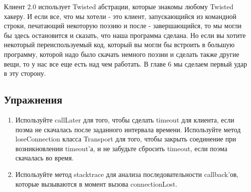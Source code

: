 Клиент 2.0 использует Twisted абстрации, которые 
знакомы любому Twisted хакеру. И если все, что мы хотели - 
это клиент, запускающийся из командной строки, печатающий 
некоторую поэзию и после - завершающийся, то мы могли бы здесь остановится и 
сказать, что наша программа сделана. Но если вы хотите некоторый 
переиспользуемый код, который вы могли 
бы встроить в большую программу, которой надо было 
скачать немного поэзии и сделать также другие вещи, то у нас все 
еще есть над чем работать. В главе 6 мы сделаем первый удар в эту сторону.

\subsection{Упражнения}

\begin{enumerate}
\item Используйте callLater для того, чтобы сделать timeout для клиента, 
если поэма не скачалась после заданного интервала времени. 
Используйте метод loseConnection класса Transport  для того, чтобы закрыть соединение 
при возникновлении timeout'а, и не забудьте сбросить timeout, если 
поэма скачалась во время. 
\item Используйте метод stacktrace для анализа последовательности 
callback'ов, которые вызываются в момент вызова connectionLost.
\end{enumerate}


